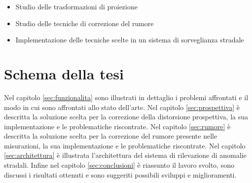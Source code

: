 \begin{itemize}
	\item Studio delle trasformazioni di proiezione
	\item Studio delle tecniche di correzione del rumore
	\item Implementazione delle tecniche scelte in un sistema di sorveglianza stradale
\end{itemize}

\section{Schema della tesi}

Nel capitolo \ref{sec:funzionalita} sono illustrati in dettaglio i problemi affrontati e il modo in cui sono affrontati allo stato dell'arte.
Nel capitolo \ref{sec:prospettiva} è descritta la soluzione scelta per la correzione della distorsione prospettiva, la sua implementazione e le problematiche riscontrate.
Nel capitolo \ref{sec:rumore} è descritta la soluzione scelta per la correzione del rumore presente nelle misurazioni, la sua implementazione e le problematiche riscontrate.
Nel capitolo \ref{sec:architettura} è illustrata l'architettura del sistema di rilevazione di anomalie stradali.
Infine nel capitolo \ref{sec:conclusioni} è riassunto il lavoro svolto, sono discussi i risultati ottenuti e sono suggeriti possibili sviluppi e miglioramenti.
